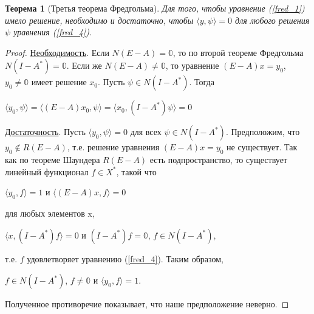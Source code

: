 \documentclass[12pt,a4paper,titlepage,oneside]{book}
\theoremstyle{definition}
\theoremstyle{plain}
\newtheorem*{theorem}{Теорема}
\theoremstyle{break}
\theoremstyle{remark}
\theoremstyle{remark}
\theoremstyle{remark}
\theoremstyle{remark}
\theoremstyle{plain}
\theoremstyle{plain}
\begin{document}
\begin{theorem}[Третья теорема Фредгольма]
Для того, чтобы уравнение (\ref{fred_1}) имело решение, необходимо и достаточно, чтобы $ \langle y,\psi \rangle =0$ для любого решения $\psi$ уравнения (\ref{fred_4}).
\end{theorem}
\begin{proof}
\underline{Необходимость}. Если $N(E-A)={\mathbb{0}}$, то по второй теореме Фредгольма $N(I-A^*)={\mathbb{0}}$. Если же $N(E-A)\neq {\mathbb{0}}$, то уравнение $(E-A)x=y_0$, $y_0 \neq \mathbb{0}$ имеет решение $x_0$. Пусть $\psi \in N(I-A^*)$. Тогда
\begin{center}
$ \langle y_0,\psi \rangle = \langle (E-A)x_0,\psi \rangle = \langle x_0,(I-A^*)\psi \rangle =0$
\end{center}
\underline{Достаточность}. Пусть $ \langle y_0,\psi \rangle =0$ для всех $\psi \in N(I-A^*)$. Предположим, что \\$y_0 \not \in R(E-A)$, т.е. решение уравнения $(E-A)x=y_0$ не существует. Так как по теореме Шаундера $R(E-A)$ есть подпространство, то существует линейный функционал $f\in X^*$, такой что 
\begin{center}
$ \langle y_0,f \rangle =1$ и $ \langle (E-A)x,f \rangle =0$
\end{center}
для любых элементов x,
\begin{center}
$ \langle x,(I-A^*)f \rangle =0$ и $(I-A^*)f=\mathbb{0}$, $f \in N(I-A^*)$,
\end{center}
т.е. $f$ удовлетворяет уравнению (\ref{fred_4}). Таким образом,
\begin{center}
 $f \in N(I-A^*)$, $f\neq \mathbb{0}$ и $ \langle y_0,f \rangle =1$.
\end{center}
Полученное противоречие показывает, что наше предположение неверно.
\end{proof}
\end{document}

